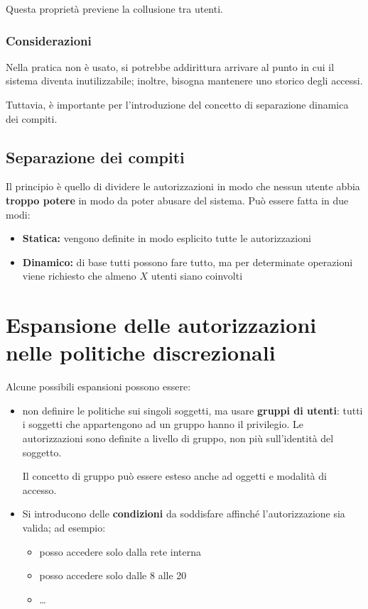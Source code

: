 \documentclass{report}
\begin{document}
\noindent Questa proprietà previene la collusione tra utenti.

\subsection{Considerazioni}
Nella pratica non è usato, si potrebbe addirittura arrivare al punto in cui il sistema diventa 
inutilizzabile; inoltre, bisogna mantenere uno storico degli accessi.

\noindent Tuttavia, è importante per l'introduzione del concetto di separazione dinamica dei compiti.

\section{Separazione dei compiti}
Il principio è quello di dividere le autorizzazioni in modo che nessun utente abbia \textbf{troppo potere} 
in modo da poter abusare del sistema. Può essere fatta in due modi:
\begin{itemize}
    \item \textbf{Statica:} vengono definite in modo esplicito tutte le autorizzazioni 
    \item \textbf{Dinamico:} di base tutti possono fare tutto, ma per determinate operazioni 
    viene richiesto che almeno $X$ utenti siano coinvolti
\end{itemize}


\chapter{Espansione delle autorizzazioni nelle politiche discrezionali}

Alcune possibili espansioni possono essere:
\begin{itemize}
    \item non definire le politiche sui singoli soggetti, ma usare \textbf{gruppi di utenti}: tutti 
    i soggetti che appartengono ad un gruppo hanno il privilegio. Le autorizzazioni sono definite a livello 
    di gruppo, non più sull'identità del soggetto.

    \noindent Il concetto di gruppo può essere esteso anche ad oggetti e modalità di accesso.
    \item Si introducono delle \textbf{condizioni} da soddisfare affinché l'autorizzazione sia valida; ad esempio:
    \begin{itemize}
        \item posso accedere solo dalla rete interna 
        \item posso accedere solo dalle 8 alle 20
        \item \dots
    \end{itemize}
\end{itemize}
\end{document}
